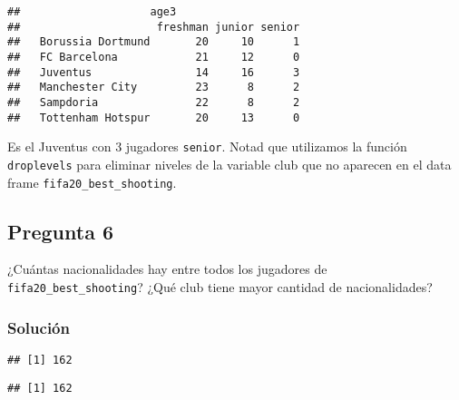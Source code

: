 \documentclass[
]{article}
\newenvironment{Shaded}{\begin{snugshade}}{\end{snugshade}}
\newcommand{\KeywordTok}[1]{\textcolor[rgb]{0.13,0.29,0.53}{\textbf{#1}}}
\newcommand{\NormalTok}[1]{#1}
\newcommand{\OperatorTok}[1]{\textcolor[rgb]{0.81,0.36,0.00}{\textbf{#1}}}
\begin{document}
\begin{verbatim}
##                    age3
##                     freshman junior senior
##   Borussia Dortmund       20     10      1
##   FC Barcelona            21     12      0
##   Juventus                14     16      3
##   Manchester City         23      8      2
##   Sampdoria               22      8      2
##   Tottenham Hotspur       20     13      0
\end{verbatim}

Es el Juventus con 3 jugadores \texttt{senior}. Notad que utilizamos la
función \texttt{droplevels} para eliminar niveles de la variable club
que no aparecen en el data frame \texttt{fifa20\_best\_shooting}.

\hypertarget{pregunta-6}{%
\subsection{Pregunta 6}\label{pregunta-6}}

¿Cuántas nacionalidades hay entre todos los jugadores de
\texttt{fifa20\_best\_shooting}? ¿Qué club tiene mayor cantidad de
nacionalidades?

\hypertarget{soluciuxf3n-6}{%
\subsubsection{Solución}\label{soluciuxf3n-6}}

\begin{Shaded}
\end{Shaded}

\begin{verbatim}
## [1] 162
\end{verbatim}

\begin{Shaded}
\end{Shaded}

\begin{verbatim}
## [1] 162
\end{verbatim}
\end{document}
